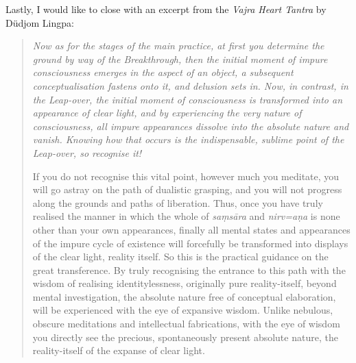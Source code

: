 \documentclass[11pt,twocolumn]{article}
\begin{document}
Lastly, I would like to close with an excerpt from the \emph{Vajra
Heart Tantra} by Düdjom Lingpa:
\begin{quote}
  \it Now as for the stages of the main practice, at first you
  determine the ground by way of the Breakthrough, then the initial
  moment of impure consciousness emerges in the aspect of an object, a
  subsequent conceptualisation fastens onto it, and delusion sets
  in. Now, in contrast, in the Leap\hyp{}over, the initial moment of
  consciousness is transformed into an appearance of clear light, and
  by experiencing the very nature of consciousness, all impure
  appearances dissolve into the absolute nature and vanish. Knowing
  how that occurs is the indispensable, sublime point of the
  Leap\hyp{}over, so recognise it!

  If you do not recognise this vital point, however much you meditate,
  you will go astray on the path of dualistic grasping, and you will
  not progress along the grounds and paths of liberation. Thus, once
  you have truly realised the manner in which the whole of
  \emph{sa\d{m}s\={a}ra} and \emph{nirv\a={a}\d{n}a} is none other
  than your own appearances, finally all mental states and appearances
  of the impure cycle of existence will forcefully be transformed into
  displays of the clear light, reality itself. So this is the
  practical guidance on the great transference. By truly recognising
  the entrance to this path with the wisdom of realising
  identitylessness, originally pure reality\hyp{}itself, beyond mental
  investigation, the absolute nature free of conceptual elaboration,
  will be experienced with the eye of expansive wisdom. Unlike
  nebulous, obscure meditations and intellectual fabrications, with
  the eye of wisdom you directly see the precious, spontaneously
  present absolute nature, the reality\hyp{}itself of the expanse of
  clear light.
\end{quote}
\end{document}

